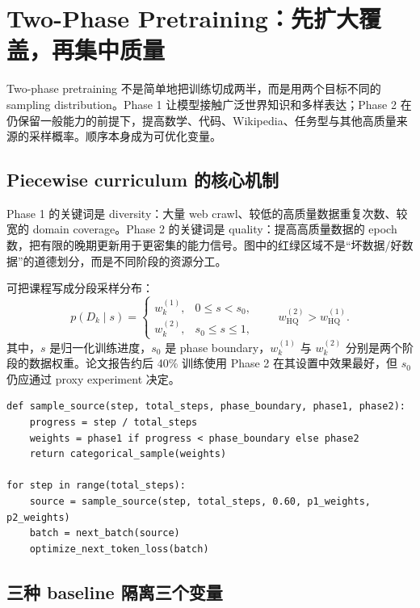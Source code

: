 \section{Two-Phase Pretraining：先扩大覆盖，再集中质量}

Two-phase pretraining 不是简单地把训练切成两半，而是用两个目标不同的 sampling distribution。Phase 1 让模型接触广泛世界知识和多样表达；Phase 2 在仍保留一般能力的前提下，提高数学、代码、Wikipedia、任务型与其他高质量来源的采样概率。顺序本身成为可优化变量。

\subsection{Piecewise curriculum 的核心机制}

Phase 1 的关键词是 diversity：大量 web crawl、较低的高质量数据重复次数、较宽的 domain coverage。Phase 2 的关键词是 quality：提高高质量数据的 epoch 数，把有限的晚期更新用于更密集的能力信号。图中的红绿区域不是“坏数据/好数据”的道德划分，而是不同阶段的资源分工。


可把课程写成分段采样分布：
\[
p(D_k\mid s)=
\begin{cases}
w_k^{(1)}, & 0\le s<s_0,\\
w_k^{(2)}, & s_0\le s\le 1,
\end{cases}
\qquad
w_{\text{HQ}}^{(2)}>w_{\text{HQ}}^{(1)}.
\]
其中，$s$ 是归一化训练进度，$s_0$ 是 phase boundary，$w_k^{(1)}$ 与 $w_k^{(2)}$ 分别是两个阶段的数据权重。论文报告约后 40\% 训练使用 Phase 2 在其设置中效果最好，但 $s_0$ 仍应通过 proxy experiment 决定。

\begin{lstlisting}[caption={固定 token budget 下的 two-phase sampler}]
def sample_source(step, total_steps, phase_boundary, phase1, phase2):
    progress = step / total_steps
    weights = phase1 if progress < phase_boundary else phase2
    return categorical_sample(weights)

for step in range(total_steps):
    source = sample_source(step, total_steps, 0.60, p1_weights, p2_weights)
    batch = next_batch(source)
    optimize_next_token_loss(batch)
\end{lstlisting}

\subsection{三种 baseline 隔离三个变量}

